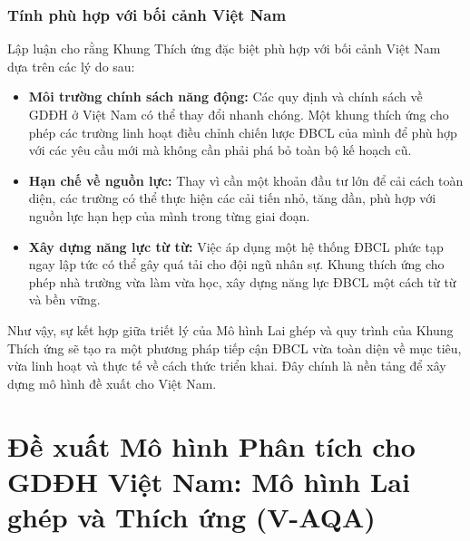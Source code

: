\documentclass[12pt, a4paper, openany]{report}
\begin{document}
\subsubsection{Tính phù hợp với bối cảnh Việt Nam}
Lập luận cho rằng Khung Thích ứng đặc biệt phù hợp với bối cảnh Việt Nam dựa trên các lý do sau:
\begin{itemize}
    \item \textbf{Môi trường chính sách năng động:} Các quy định và chính sách về GDĐH ở Việt Nam có thể thay đổi nhanh chóng. Một khung thích ứng cho phép các trường linh hoạt điều chỉnh chiến lược ĐBCL của mình để phù hợp với các yêu cầu mới mà không cần phải phá bỏ toàn bộ kế hoạch cũ.
    \item \textbf{Hạn chế về nguồn lực:} Thay vì cần một khoản đầu tư lớn để cải cách toàn diện, các trường có thể thực hiện các cải tiến nhỏ, tăng dần, phù hợp với nguồn lực hạn hẹp của mình trong từng giai đoạn.
    \item \textbf{Xây dựng năng lực từ từ:} Việc áp dụng một hệ thống ĐBCL phức tạp ngay lập tức có thể gây quá tải cho đội ngũ nhân sự. Khung thích ứng cho phép nhà trường vừa làm vừa học, xây dựng năng lực ĐBCL một cách từ từ và bền vững.
\end{itemize}
Như vậy, sự kết hợp giữa triết lý của Mô hình Lai ghép và quy trình của Khung Thích ứng sẽ tạo ra một phương pháp tiếp cận ĐBCL vừa toàn diện về mục tiêu, vừa linh hoạt và thực tế về cách thức triển khai. Đây chính là nền tảng để xây dựng mô hình đề xuất cho Việt Nam.

\section{Đề xuất Mô hình Phân tích cho GDĐH Việt Nam: Mô hình Lai ghép và Thích ứng (V-AQA)}
\label{sec:mo_hinh_V-AQA_de_xuat}
\end{document}
